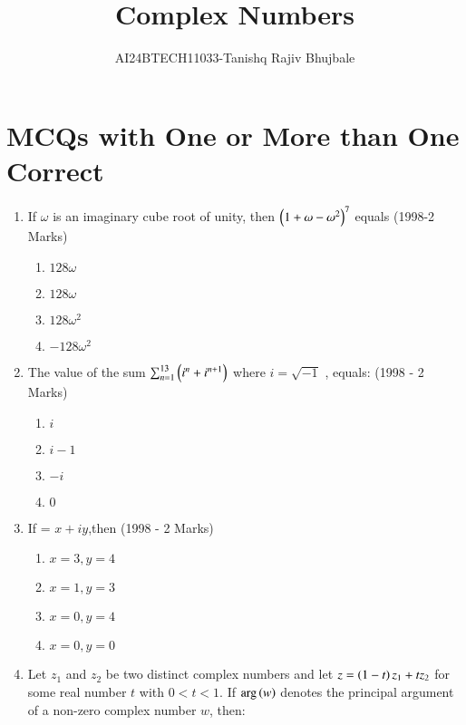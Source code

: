 \documentclass[journal,12pt,twocolumn]{IEEEtran}
\theoremstyle{remark}
\begin{document}

\vspace{3cm}
\title{Complex Numbers}
\author{AI24BTECH11033-Tanishq Rajiv Bhujbale}
\maketitle
\newpage
\bigskip

\renewcommand{\thefigure}{\theenumi}
\renewcommand{\thetable}{\theenumi}

\section{MCQs with One or More than One Correct}
\begin{enumerate}
    \item If $\omega$ is an imaginary cube root of unity, then 
    $\left(1+\omega-\omega^2\right)^7$ equals \hfill (1998-2 Marks)
    \begin{enumerate}
    \item $128\omega$    
    \item $128\omega$
    \item $128\omega^2$
    \item $-128\omega^2$
    \end{enumerate}
    \item The value of the sum 
   $\sum_{n=1}^{13} \left(i^n+i^{n+1}\right)$
where  $i=\sqrt{-1}$ , equals: \hfill (1998 - 2 Marks)
\begin{multicols}{4}
    \begin{enumerate}
    \item $i$
    \item $i - 1$
    \item $-i$
    \item $0$
    \end{enumerate}
\end{multicols}
    \item If 
    = $x+iy$,then \hfill (1998 - 2 Marks)
\begin{enumerate}
    \item $x=3,y=4$    
    \item $x=1,y=3$ 
    \item $x=0,y=4$
    \item $x=0,y=0$
    \end{enumerate}
    \item Let $z_1$ and $z_2$ be two distinct complex numbers and let $z= \left(1-t\right)z_1+tz_2$ for some real number $t$ with $0<t<1$. If $\mathrm{arg}\left(w\right)$ denotes the principal argument of a non-zero complex number $w$, then: 

\end{enumerate}
\end{document}
